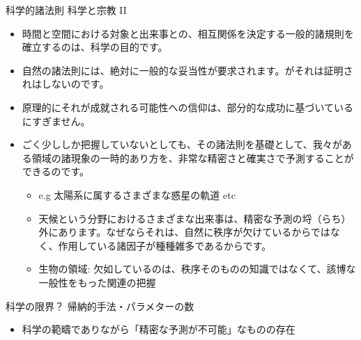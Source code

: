 \documentclass[10pt, dvipdfmx]{beamer}
\begin{document}
\begin{frame}{}

\begin{block}{科学的諸法則 \hfill 科学と宗教 II}
\begin{itemize}
\item 時間と空間における対象と出来事との、相互関係を決定する一般的諸規則を確立するのは、科学の目的です。
\item 自然の諸法則には、絶対に一般的な妥当性が要求されます。がそれは証明されはしないのです。
\item 原理的にそれが成就される可能性への信仰は、部分的な成功に基づいているにすぎません。
\item ごく少ししか把握していないとしても、その諸法則を基礎として、我々がある領域の諸現象の一時的あり方を、非常な精密さと確実さで予測することができるのです。
\begin{itemize}
\item e.g 太陽系に属するさまざまな惑星の軌道 etc
\item 天候という分野におけるさまざまな出来事は、精密な予測の埒（らち）外にあります。なぜならそれは、自然に秩序が欠けているからではなく、作用している諸因子が種種雑多であるからです。
\item 生物の領域: 欠如しているのは、秩序そのものの知識ではなくて、該博な一般性をもった関連の把握
\end{itemize}
\end{itemize}
\end{block}

\begin{alertblock}{科学の限界？ 帰納的手法・パラメターの数}
\begin{itemize}
\item 科学の範疇でありながら「精密な予測が不可能」なものの存在
\end{itemize}
\end{alertblock}

\end{frame}
\end{document}
